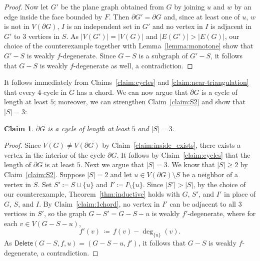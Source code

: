 \documentclass[11pt]{article}
\theoremstyle{slantthm}
\newtheorem{claim}{Claim}%
\numberwithin{equation}{section}
\theoremstyle{definition}
\renewcommand{\geq}{\geqslant}
\newcommand{\defeq}{\coloneqq}
\numberwithin{equation}{section}
\newcommand{\0}{\varnothing}
\newcommand{\set}[1]{\{#1\}}
\newcommand{\del}{\mathsf{Delete}}
\newcommand{\bdry}[1]{{\partial #1}}
\begin{document}
\begin{proof}
        Now let $G'$ be the plane graph obtained from $G$ by joining $u$ and $w$ by an edge inside the face bounded by $F$. Then $\bdry{G'} = \bdry{G}$ and, since at least one of $u$, $w$ is not in $V(\bdry{G})$, $I$ is an independent set in $G'$ and no vertex in $I$ is adjacent in $G'$ to $3$ vertices in $S$. As $|V(G')| = |V(G)|$ and $|E(G')| > |E(G)|$, our choice of the counterexample together with Lemma~\ref{lemma:monotone} show that $G' - S$ is weakly $f$-degenerate. Since $G - S$ is a subgraph of $G' - S$, it follows that $G - S$ is weakly $f$-degenerate as well, a contradiction.
    \end{proof}

    It follows immediately from Claims~\ref{claim:cycles} and \ref{claim:near-triangulation} that every $4$-cycle in $G$ has a chord. We can now argue that $\bdry{G}$ is a cycle of length at least $5$; moreover, we can strengthen Claim~\ref{claim:S2} and show that $|S| = 3$:

    \begin{claim}\label{claim:5}
        $\bdry{G}$ is a cycle of length at least $5$ and $|S| = 3$.
    \end{claim}
    \begin{proof}
        Since $V(G) \neq V(\bdry{G})$ by Claim~\ref{claim:inside_exists}, there exists a vertex in the interior of the cycle $\bdry{G}$. It follows by Claim~\ref{claim:cycles} that the length of $\bdry{G}$ is at least $5$. Next we argue that $|S| = 3$. We know that $|S| \geq 2$ by Claim~\ref{claim:S2}. Suppose $|S| = 2$ and let $u \in V(\bdry{G}) \setminus S$ be a neighbor of a vertex in $S$. Set $S' \defeq S \cup \set{u}$ and $I' \defeq I \setminus \set{u}$. Since $|S'| > |S|$, by the choice of our counterexample, Theorem~\ref{thm:inductive} holds with $G$, $S'$, and $I'$ in place of $G$, $S$, and $I$. By Claim~\ref{claim:1chord}, no vertex in $I'$ can be adjacent to all $3$ vertices in $S'$, so the graph $G - S' = G - S - u$ is weakly $f'$-degenerate, where for each $v \in V(G - S - u)$,
    \[
        f'(v) \,\defeq\, f(v) - \deg_{\set{u}} (v).
    \]
    As $\del(G - S,f,u) = (G - S - u, f')$, it follows that $G - S$ is weakly $f$-degenerate, a contradiction. %
    \end{proof}
\end{document}
